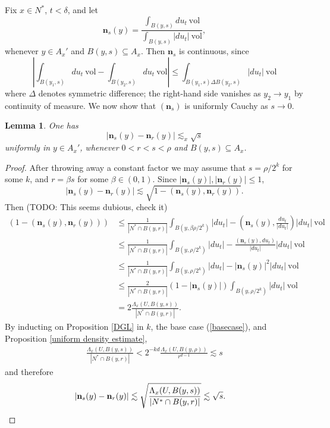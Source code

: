 \documentclass[reqno,12pt,letterpaper]{amsart}
\newcommand{\normal}{\mathbf n}
\newcommand{\vol}{\mathrm{vol}}
\newtheorem{lemma}[theorem]{Lemma}
\theoremstyle{definition}
\numberwithin{equation}{section}
\begin{document}
Fix $x \in N^*$, $t < \delta$, and let
$$\normal_s(y) = \frac{\int_{B(y, s)} du_t ~\vol}{\int_{B(y, s)} |du_t| ~\vol},$$
whenever $y \in A_x'$ and $B(y, s) \subseteq A_x$.
Then $\normal_s$ is continuous, since
$$\left|\int_{B(y_1, s)} du_t ~\vol - \int_{B(y_2, s)} du_t ~\vol\right| \leq \int_{B(y_1, s) \Delta B(y_2, s)} |du_t| ~\vol$$
where $\Delta$ denotes symmetric difference; the right-hand side vanishes as $y_2 \to y_1$ by continuity of measure.
We now show that $(\normal_s)$ is uniformly Cauchy as $s \to 0$.

\begin{lemma}
One has
$$|\normal_s(y) - \normal_r(y)| \lesssim_x \sqrt s$$
uniformly in $y \in A_x'$, whenever $0 < r < s < \rho$ and $B(y, s) \subseteq A_x$.
\end{lemma}
\begin{proof}
After throwing away a constant factor we may assume that $s = \rho/2^k$ for some $k$, and $r = \beta s$ for some $\beta \in (0, 1)$.
Since $|\normal_s(y)|,|\normal_r(y)| \leq 1$,
$$|\normal_s(y) - \normal_r(y)| \lesssim \sqrt{1 - (\normal_s(y), \normal_r(y))}.$$
Then (TODO: This seems dubious, check it)
\begin{align*}
(1 - (\normal_s(y), \normal_r(y)))  &\leq \frac{1}{|N^* \cap B(y, r)|} \int_{B(y, \beta \rho/2^k)} |du_t| - \left(\normal_s(y), \frac{du_t}{|du_t|}\right) |du_t| ~\vol\\
&\leq \frac{1}{|N^* \cap B(y, r)|} \int_{B(y, \rho/2^k)} |du_t| - \frac{(\normal_s(y), du_t)}{|du_t|} |du_t| ~\vol \\
&\leq \frac{1}{|N^* \cap B(y, r)|} \int_{B(y, \rho/2^k)} |du_t| - |\normal_s(y)|^2 |du_t| ~\vol\\
&\leq \frac{2}{|N^* \cap B(y, r)|} (1 - |\normal_s(y)|)\int_{B(y, \rho/2^k)} |du_t| ~\vol\\
&= 2\frac{\Lambda_x(U, B(y, s))}{|N^* \cap B(y, r)|}.
\end{align*}
By inducting on Proposition \ref{DGL} in $k$, the base case (\ref{basecase}), and Proposition \ref{uniform density estimate},
\begin{align*}
\frac{\Lambda_x(U, B(y, s))}{|N^* \cap B(y, r)|} < 2^{-kd} \frac{\Lambda_x(U, B(y, \rho))}{r^{d - 1}} \lesssim s
\end{align*}
and therefore
\begin{align*}
|\normal_s(y) - \normal_r(y)| &\lesssim \sqrt{\frac{\Lambda_x(U, B(y, s))}{|N^* \cap B(y, r)|}} \lesssim \sqrt s. \qedhere
\end{align*}
\end{proof}
\end{document}
